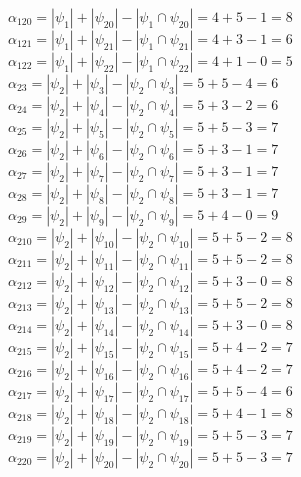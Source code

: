 \documentclass[a4paper,12pt]{article}
\begin{document}
$\alpha_{120} = |\psi_{1}| + |\psi_{20}| - |\psi_{1} \cap \psi_{20}| = 4 + 5 - 1 = 8$\\
$\alpha_{121} = |\psi_{1}| + |\psi_{21}| - |\psi_{1} \cap \psi_{21}| = 4 + 3 - 1 = 6$\\
$\alpha_{122} = |\psi_{1}| + |\psi_{22}| - |\psi_{1} \cap \psi_{22}| = 4 + 1 - 0 = 5$\\
$\alpha_{23} = |\psi_{2}| + |\psi_{3}| - |\psi_{2} \cap \psi_{3}| = 5 + 5 - 4 = 6$\\
$\alpha_{24} = |\psi_{2}| + |\psi_{4}| - |\psi_{2} \cap \psi_{4}| = 5 + 3 - 2 = 6$\\
$\alpha_{25} = |\psi_{2}| + |\psi_{5}| - |\psi_{2} \cap \psi_{5}| = 5 + 5 - 3 = 7$\\
$\alpha_{26} = |\psi_{2}| + |\psi_{6}| - |\psi_{2} \cap \psi_{6}| = 5 + 3 - 1 = 7$\\
$\alpha_{27} = |\psi_{2}| + |\psi_{7}| - |\psi_{2} \cap \psi_{7}| = 5 + 3 - 1 = 7$\\
$\alpha_{28} = |\psi_{2}| + |\psi_{8}| - |\psi_{2} \cap \psi_{8}| = 5 + 3 - 1 = 7$\\
$\alpha_{29} = |\psi_{2}| + |\psi_{9}| - |\psi_{2} \cap \psi_{9}| = 5 + 4 - 0 = 9$\\
$\alpha_{210} = |\psi_{2}| + |\psi_{10}| - |\psi_{2} \cap \psi_{10}| = 5 + 5 - 2 = 8$\\
$\alpha_{211} = |\psi_{2}| + |\psi_{11}| - |\psi_{2} \cap \psi_{11}| = 5 + 5 - 2 = 8$\\
$\alpha_{212} = |\psi_{2}| + |\psi_{12}| - |\psi_{2} \cap \psi_{12}| = 5 + 3 - 0 = 8$\\
$\alpha_{213} = |\psi_{2}| + |\psi_{13}| - |\psi_{2} \cap \psi_{13}| = 5 + 5 - 2 = 8$\\
$\alpha_{214} = |\psi_{2}| + |\psi_{14}| - |\psi_{2} \cap \psi_{14}| = 5 + 3 - 0 = 8$\\
$\alpha_{215} = |\psi_{2}| + |\psi_{15}| - |\psi_{2} \cap \psi_{15}| = 5 + 4 - 2 = 7$\\
$\alpha_{216} = |\psi_{2}| + |\psi_{16}| - |\psi_{2} \cap \psi_{16}| = 5 + 4 - 2 = 7$\\
$\alpha_{217} = |\psi_{2}| + |\psi_{17}| - |\psi_{2} \cap \psi_{17}| = 5 + 5 - 4 = 6$\\
$\alpha_{218} = |\psi_{2}| + |\psi_{18}| - |\psi_{2} \cap \psi_{18}| = 5 + 4 - 1 = 8$\\
$\alpha_{219} = |\psi_{2}| + |\psi_{19}| - |\psi_{2} \cap \psi_{19}| = 5 + 5 - 3 = 7$\\
$\alpha_{220} = |\psi_{2}| + |\psi_{20}| - |\psi_{2} \cap \psi_{20}| = 5 + 5 - 3 = 7$\\
\end{document}
